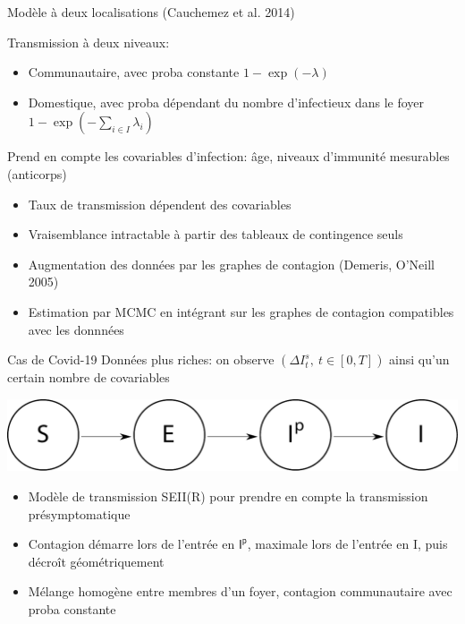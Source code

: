 \documentclass[dvipsnames,professionalfont,french]{beamer}
\begin{document}
\begin{frame}{Modèle à deux localisations (Cauchemez et al. 2014)}

Transmission à deux niveaux:
\begin{itemize}
\item Communautaire, avec proba constante \(1-\exp(-\lambda)\)
\item Domestique, avec proba dépendant du nombre d'infectieux dans le foyer 
\(1-\exp(-\sum_{i\in I} \lambda_i)\)
\end{itemize}

Prend en compte les covariables d'infection: âge, niveaux
d'immunité mesurables (anticorps)
\begin{itemize}
\item Taux de transmission dépendent des covariables
\item Vraisemblance intractable à partir des tableaux de contingence seuls
\item Augmentation des données par les graphes de contagion (Demeris, O'Neill
2005)
\item Estimation par MCMC en intégrant sur les graphes de contagion compatibles
avec les donnnées
\end{itemize}
\end{frame}

\begin{frame}{Cas de Covid-19}
Données plus riches: on observe \((\Delta I_t^s,\ t\in [0,T])\) ainsi qu'un
certain nombre de covariables

\begin{center}
\includegraphics[width=.8\textwidth]{Images/SEIIR.pdf}
\end{center}

\begin{itemize}
\item Modèle de transmission SEII(R) pour prendre en compte la transmission
présymptomatique
\item Contagion démarre lors de l'entrée en \(\mathsf{I}^\mathsf{p}\), maximale
lors de l'entrée en I, puis décroît géométriquement
\item Mélange homogène entre membres d'un foyer, contagion communautaire avec
proba constante
\end{itemize}
\end{frame}
\end{document}
